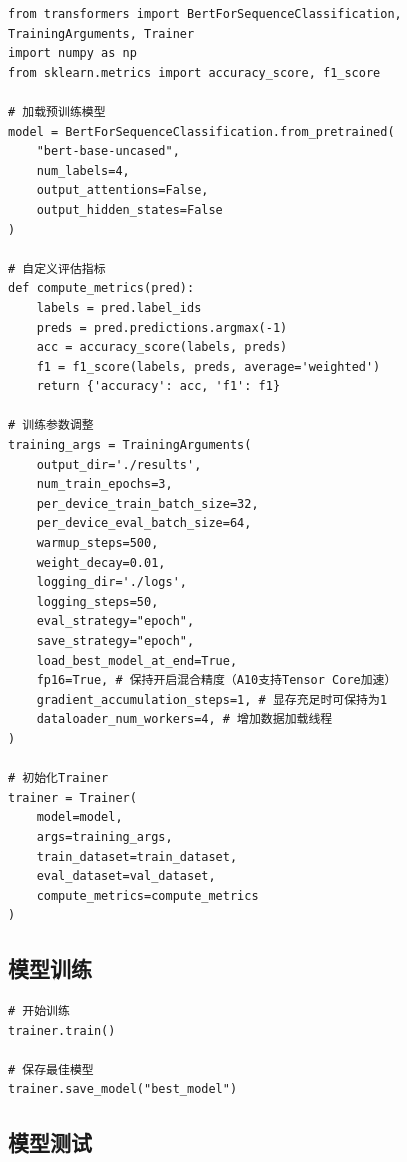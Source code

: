 \documentclass{cjc}
\begin{document}
\begin{verbatim}
from transformers import BertForSequenceClassification, TrainingArguments, Trainer
import numpy as np
from sklearn.metrics import accuracy_score, f1_score

# 加载预训练模型
model = BertForSequenceClassification.from_pretrained(
    "bert-base-uncased",
    num_labels=4,
    output_attentions=False,
    output_hidden_states=False
)

# 自定义评估指标
def compute_metrics(pred):
    labels = pred.label_ids
    preds = pred.predictions.argmax(-1)
    acc = accuracy_score(labels, preds)
    f1 = f1_score(labels, preds, average='weighted')
    return {'accuracy': acc, 'f1': f1}

# 训练参数调整
training_args = TrainingArguments(
    output_dir='./results',
    num_train_epochs=3,
    per_device_train_batch_size=32,
    per_device_eval_batch_size=64,
    warmup_steps=500,
    weight_decay=0.01,
    logging_dir='./logs',
    logging_steps=50,
    eval_strategy="epoch",
    save_strategy="epoch",
    load_best_model_at_end=True,
    fp16=True, # 保持开启混合精度（A10支持Tensor Core加速）
    gradient_accumulation_steps=1, # 显存充足时可保持为1
    dataloader_num_workers=4, # 增加数据加载线程
)

# 初始化Trainer
trainer = Trainer(
    model=model,
    args=training_args,
    train_dataset=train_dataset,
    eval_dataset=val_dataset,
    compute_metrics=compute_metrics
)
\end{verbatim}

\subsection{模型训练}

\begin{verbatim}
# 开始训练
trainer.train()

# 保存最佳模型
trainer.save_model("best_model")
\end{verbatim}

\subsection{模型测试}
\end{document}
